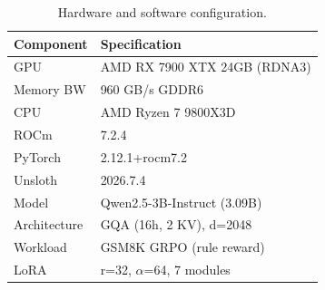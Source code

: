 \begin{table}[t]
\centering
\small
\caption{Hardware and software configuration.}
\label{tab:platform}
\begin{tabular}{@{}ll@{}}
\toprule
\textbf{Component} & \textbf{Specification} \\
\midrule
GPU & AMD RX 7900 XTX 24GB (RDNA3) \\
Memory BW & 960 GB/s GDDR6 \\
CPU & AMD Ryzen 7 9800X3D \\
ROCm & 7.2.4 \\
PyTorch & 2.12.1+rocm7.2 \\
Unsloth & 2026.7.4 \\
\midrule
Model & Qwen2.5-3B-Instruct (3.09B) \\
Architecture & GQA (16h, 2 KV), d=2048 \\
Workload & GSM8K GRPO (rule reward) \\
LoRA & r=32, $\alpha$=64, 7 modules \\
\bottomrule
\end{tabular}
\end{table}
